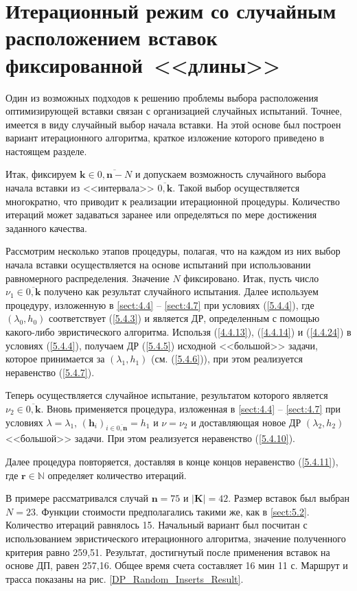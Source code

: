 
\section{
  Итерационный режим
  со случайным расположением вставок
  фиксированной~<<длины>>
}
\label{sect:5.5}
\setcounter{equation}{0}

Один из возможных подходов к решению проблемы выбора расположения оптимизирующей
вставки связан с организацией случайных испытаний.
Точнее, имеется в виду случайный выбор начала вставки.
На этой основе был построен вариант итерационного алгоритма,
краткое изложение которого приведено в настоящем разделе.

Итак, фиксируем
$\mathbf{k}\in \overline{0,\mathbf{n}-N}$
и допускаем возможность
случайного выбора начала вставки из <<интервала>> $\overline{0,\mathbf{k}}$.
Такой выбор осуществляется многократно,
что приводит к реализации итерационной процедуры.
Количество итераций может задаваться заранее или определяться
по мере достижения заданного качества.

Рассмотрим несколько этапов процедуры,
полагая, что на каждом из них выбор начала вставки осуществляется
на основе испытаний при использовании равномерного распределения.
Значение $N$ фиксировано.
Итак, пусть число
$\nu_1\in \overline{0,\mathbf{k}}$
получено как результат случайного испытания.
Далее используем процедуру, изложенную в \ref{sect:4.4} -- \ref{sect:4.7}
при условиях (\ref{5.4.4}),
где $(\lambda_0,h_0)$
соответствует (\ref{5.4.3})
и является ДР, определенным с помощью какого-либо эвристического алгоритма.
Использя
(\ref{4.4.13}), (\ref{4.4.14}) и (\ref{4.4.24})
в условиях (\ref{5.4.4}),
получаем ДР (\ref{5.4.5}) исходной <<большой>> задачи,
которое принимается за
$(\lambda_1,h_1)$
(см. (\ref{5.4.6})),
при этом реализуется неравенство (\ref{5.4.7}).

Теперь осуществляется случайное испытание,
результатом которого является
$\nu_2\in \overline{0,\mathbf{k}}$.
Вновь применяется процедура, изложенная
в \ref{sect:4.4} -- \ref{sect:4.7}
при условиях
$\lambda=\lambda_1$,
$(\mathbf{h}_i)_{i\in \overline{0,\mathbf{n}}}=h_1$ и
$\nu=\nu_2$
и доставляющая новое ДР
$(\lambda_2,h_2)$ <<большой>> задачи.
При этом реализуется неравенство
(\ref{5.4.10}).

Далее процедура повторяется,
доставляя в конце концов неравенство (\ref{5.4.11}),
где $\mathbf{r}\in \mathbb{N}$ определяет количество итераций.

В примере рассматривался случай
$\mathbf{n}=75$ и $|\mathbf{K}|=42$.
Размер вставок был выбран
$N=23$.
Функции стоимости предполагались такими же,
как в
\ref{sect:5.2}.
Количество итераций равнялось 15.
Начальный вариант был посчитан с использованием
эвристического итерационного алгоритма,
значение полученного критерия равно 259,51.
Результат, достигнутый после применения вставок на основе ДП, равен 257,16.
Общее время счета составляет 16 мин 11 с.
Маршрут и трасса показаны на рис.
\ref{DP_Random_Inserts_Result}.

